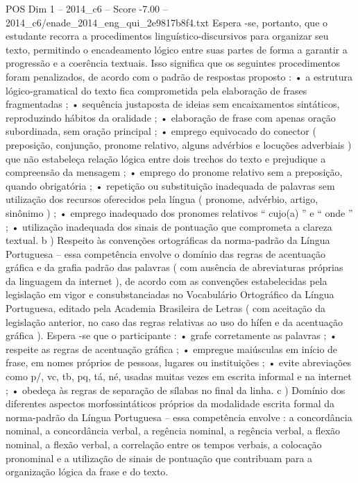 \begin{textsample}{POS Dim 1 – 2014\_c6 – Score -7.00 – 2014\_c6/enade\_2014\_eng\_qui\_2e9817b8f4.txt}
Espera -se, portanto, que o estudante recorra a procedimentos linguístico-discursivos para organizar seu texto, permitindo o encadeamento lógico entre suas partes de forma a garantir a progressão e a coerência textuais.
Isso significa que os seguintes procedimentos foram penalizados, de acordo com o padrão de respostas proposto : • a estrutura lógico-gramatical do texto fica comprometida pela elaboração de frases fragmentadas ; • sequência justaposta de ideias sem encaixamentos sintáticos, reproduzindo hábitos da oralidade ; • elaboração de frase com apenas oração subordinada, sem oração principal ; • emprego equivocado do conector ( preposição, conjunção, pronome relativo, alguns advérbios e locuções adverbiais ) que não estabeleça relação lógica entre dois trechos do texto e prejudique a compreensão da mensagem ; • emprego do pronome relativo sem a preposição, quando obrigatória ; • repetição ou substituição inadequada de palavras sem utilização dos recursos oferecidos pela língua ( pronome, advérbio, artigo, sinônimo ) ; • emprego inadequado dos pronomes relativos “ cujo(a) ” e “ onde ” ; • utilização inadequada dos sinais de pontuação que comprometa a clareza textual. b ) Respeito às convenções ortográficas da norma-padrão da Língua Portuguesa – essa competência envolve o domínio das regras de acentuação gráfica e da grafia padrão das palavras ( com ausência de abreviaturas próprias da linguagem da internet ), de acordo com as convenções estabelecidas pela legislação em vigor e consubstanciadas no Vocabulário Ortográfico da Língua Portuguesa, editado pela Academia Brasileira de Letras ( com aceitação da legislação anterior, no caso das regras relativas ao uso do hífen e da acentuação gráfica ).
Espera -se que o participante : • grafe corretamente as palavras ; • respeite as regras de acentuação gráfica ; • empregue maiúsculas em início de frase, em nomes próprios de pessoas, lugares ou instituições ; • evite abreviações como p/, vc, tb, pq, tá, né, usadas muitas vezes em escrita informal e na internet ; • obedeça às regras de separação de sílabas no final da linha. c ) Domínio dos diferentes aspectos morfossintáticos próprios da modalidade escrita formal da norma-padrão da Língua Portuguesa – essa competência envolve : a concordância nominal, a concordância verbal, a regência nominal, a regência verbal, a flexão nominal, a flexão verbal, a correlação entre os tempos verbais, a colocação pronominal e a utilização de sinais de pontuação que contribuam para a organização lógica da frase e do texto.

\end{textsample}
